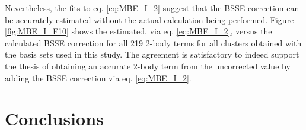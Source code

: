 \documentclass[11pt, proquest]{uwthesis}[2020/02/24]
\begin{document}
\par Nevertheless, the fits to eq. \eqref{eq:MBE_I_2} suggest that the BSSE correction can be accurately estimated without the actual calculation being performed. Figure \ref{fig:MBE_I_F10} shows the estimated, via eq. \eqref{eq:MBE_I_2}, versus the calculated BSSE correction for all 219 2-body terms for all clusters obtained with the basis sets used in this study. The agreement is satisfactory to indeed support the thesis of obtaining an accurate 2-body term from the uncorrected value by adding the BSSE correction via eq. \eqref{eq:MBE_I_2}.

\section{Conclusions}\label{sec:3_conclusions}
\end{document}
